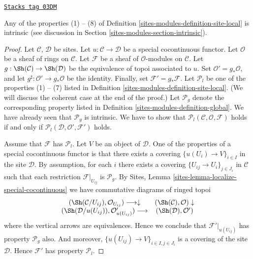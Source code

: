 \begin{lemma}
\label{sites-modules-lemma-special-locally-free}
\href{https://stacks.math.columbia.edu/tag/03DM}{\texttt{Stacks tag 03DM}}

Any of the properties (1) -- (8) of Definition \ref{sites-modules-definition-site-local}
is intrinsic (see discussion in Section \ref{sites-modules-section-intrinsic}).
\end{lemma}

\begin{proof}
Let $\mathcal{C}$, $\mathcal{D}$ be sites.
Let $u : \mathcal{C} \to \mathcal{D}$ be a special cocontinuous functor.
Let $\mathcal{O}$ be a sheaf of rings on $\mathcal{C}$.
Let $\mathcal{F}$ be a sheaf of $\mathcal{O}$-modules on $\mathcal{C}$.
Let $g : \Sh(\mathcal{C}) \to \Sh(\mathcal{D})$
be the equivalence of topoi associated to $u$.
Set $\mathcal{O}' = g_*\mathcal{O}$, and let
$g^\sharp : \mathcal{O}' \to g_*\mathcal{O}$ be the identity.
Finally, set $\mathcal{F}' = g_*\mathcal{F}$.
Let $\mathcal{P}_l$ be one of the properties (1) -- (7) listed in
Definition \ref{sites-modules-definition-site-local}.
(We will discuss the coherent case at the end of the proof.)
Let $\mathcal{P}_g$ denote the corresponding property listed in
Definition \ref{sites-modules-definition-global}. We have already seen that
$\mathcal{P}_g$ is intrinsic.
We have to show that
$\mathcal{P}_l(\mathcal{C}, \mathcal{O}, \mathcal{F})$
holds if and only if
$\mathcal{P}_l(\mathcal{D}, \mathcal{O}', \mathcal{F}')$
holds.

\medskip\noindent
Assume that $\mathcal{F}$ has $\mathcal{P}_l$.
Let $V$ be an object of $\mathcal{D}$.
One of the properties of a special cocontinuous functor is that there exists
a covering $\{u(U_i) \to V\}_{i \in I}$ in the site $\mathcal{D}$.
By assumption, for each $i$ there exists a covering
$\{U_{ij} \to U_i\}_{j \in J_i}$ in $\mathcal{C}$ such that
each restriction $\mathcal{F}|_{U_{ij}}$ is $\mathcal{P}_g$. By
Sites, Lemma \ref{sites-lemma-localize-special-cocontinuous}
we have commutative diagrams of ringed topoi
$$
\begin{array}{cc}(\Sh(\mathcal{C}/U_{ij}), \mathcal{O}_{U_{ij}}) \longrightarrow\downarrow & (\Sh(\mathcal{C}), \mathcal{O}) \downarrow \\ (\Sh(\mathcal{D}/u(U_{ij})), \mathcal{O}'_{u(U_{ij})}) \longrightarrow & (\Sh(\mathcal{D}), \mathcal{O}')\end{array}
$$
where the vertical arrows are equivalences. Hence we conclude that
$\mathcal{F}'|_{u(U_{ij})}$ has property $\mathcal{P}_g$ also.
And moreover, $\{u(U_{ij}) \to V\}_{i \in I, j \in J_i}$ is a
covering of the site $\mathcal{D}$. Hence $\mathcal{F}'$ has
property $\mathcal{P}_l$.


\end{proof}
